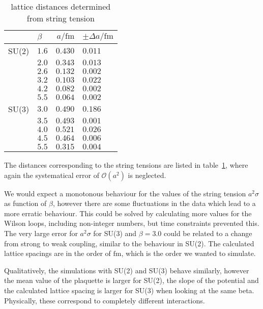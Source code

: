 \documentclass[%
 reprint,
 amsmath,amssymb,
 aps,
]{revtex4-1}
\begin{document}


\begin{table}[htbp]
	\centering
	\begin{tabular}{|r|l|r|l|}
		\hline
		&$\beta$&$a/\si{\femto\meter}$&$\pm\Delta a/\si{\femto\meter}$\\
		\hline
SU(2)	&$1.6$	&$0.430$		&$0.011$\\
		&$2.0$	&$0.343$		&$0.013$\\
		&$2.6$	&$0.132$		&$0.002$\\
		&$3.2$	&$0.103$		&$0.022$\\
		&$4.2$	&$0.082$		&$0.002$\\
		&$5.5$	&$0.064$		&$0.002$\\\hline
SU(3)	&$3.0$	&$0.490$		&$0.186$\\
		&$3.5$	&$0.493$		&$0.001$\\
		&$4.0$	&$0.521$		&$0.026$\\
		&$4.5$	&$0.464$		&$0.006$\\
		&$5.5$	&$0.315$		&$0.004$\\
		\hline
	\end{tabular}
	\caption{lattice distances determined from string tension}
	\label{tab:scalesetting}
\end{table}

The distances corresponding to the string tensions are listed in table~\ref{tab:scalesetting}, where again the systematical error of $\mathcal{O}(a^2)$ is neglected. 


We would expect a monotonous behaviour for the values of the string tension $a^2\sigma$ as function of $\beta$, however there are some fluctuations in the data which lead to a more erratic behaviour. This could be solved by calculating more values for the Wilson loops, including non-integer numbers, but time constraints prevented this. The very large error for $a^2\sigma$ for SU(3) and $\beta=3.0$ could be related to a change from strong to weak coupling, similar to the behaviour in SU(2). The calculated lattice spacings are in the order of $\si{\femto\meter}$, which is the order we wanted to simulate.

Qualitatively, the simulations with SU(2) and SU(3) behave similarly, however the mean value of the plaquette is larger for SU(2), the slope of the potential and the calculated lattice spacing is larger for SU(3) when looking at the same beta. Physically, these correspond to completely different interactions.
\end{document}
